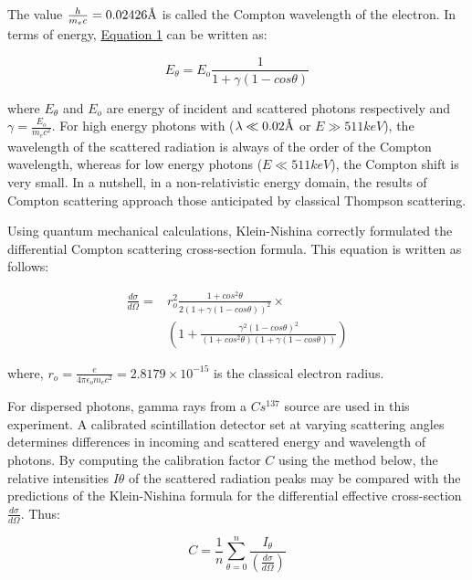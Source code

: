 	The value $\frac{h}{m_ec} = 0.02426 \textup{\AA}$ is called the Compton wavelength of the electron. In terms of energy, \hyperref[eq:1]{Equation 1} can be written as:

	\begin{equation}
		E_{\theta}=E_o\frac{1}{1+\gamma(1-cos\theta)}
		\label{eq:2}
	\end{equation}

	where $E_{\theta}$ and $E_o$ are energy of incident and scattered photons respectively and $\gamma=\frac{E_o}{m_ec^2}$. For high energy photons with ($\lambda\ll 0.02 \textup{\AA}$ or $E \gg 511 keV$), the wavelength of the scattered radiation is always of the order of the Compton wavelength, whereas for low energy photons ($E \ll 511 keV$), the Compton shift is very small. In a nutshell, in a non-relativistic energy domain, the results of Compton scattering approach those anticipated by classical Thompson scattering. 

	Using quantum mechanical calculations, Klein-Nishina correctly formulated the differential Compton scattering cross-section formula. This equation is written as follows:

	\begin{equation}
		\begin{split}
			\frac{d\sigma}{d\Omega} = & r_o^2\frac{1+ cos^2\theta}{2(1+\gamma(1-cos\theta))^2} \times \\
		 & \left(1+\frac{\gamma^2(1-cos\theta)^2}{(1+ cos^2\theta)(1+\gamma(1-cos\theta))}\right)
		\end{split}
		\label{eq:3}
	\end{equation}

	where, $r_o=\frac{e}{4\pi\epsilon_om_ec^2} = 2.8179 \times 10^{-15}  $ is the classical electron radius.

	For dispersed photons, gamma rays from a $Cs^{137}$ source are used in this experiment. A calibrated scintillation detector set at varying scattering angles determines differences in incoming and scattered energy and wavelength of photons. By computing the calibration factor $C$ using the method below, the relative intensities $I\theta$ of the scattered radiation peaks may be compared with the predictions of the Klein-Nishina formula for the differential effective cross-section $\frac{d\sigma}{d\Omega}$. Thus:

	\begin{equation}
		C=\frac{1}{n}\sum_{\theta=0}^{n}\frac{I_\theta}{(\frac{d\sigma}{d\Omega})}
		\label{eq:4}
	\end{equation}
